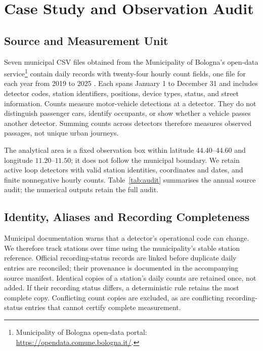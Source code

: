 \documentclass[]{interact}
\begin{document}
\section{Case Study and Observation Audit}
\subsection{Source and Measurement Unit}
Seven municipal CSV files obtained from the Municipality of Bologna's open-data service\footnote{Municipality of Bologna open-data portal: \url{https://opendata.comune.bologna.it/}.} contain daily records with twenty-four hourly count fields, one file for each year from 2019 to 2025 \cite{counts}. Each spans January 1 to December 31 and includes detector codes, station identifiers, positions, device types, status, and street information. Counts measure motor-vehicle detections at a detector. They do not distinguish passenger cars, identify occupants, or show whether a vehicle passes another detector. Summing counts across detectors therefore measures observed passages, not unique urban journeys.

The analytical area is a fixed observation box within latitude $44.40$--$44.60$ and longitude $11.20$--$11.50$; it does not follow the municipal boundary. We retain active loop detectors with valid station identities, coordinates and dates, and finite nonnegative hourly counts. Table~\ref{tab:audit} summarises the annual source audit; the numerical outputs retain the full audit.

\begin{table}[t]
\caption{Source audit before cross-year stability checks and panel selection. Complete detector-days require all 24 hourly recording flags to equal 100\%. Zero-total days are retained, not treated as missing.}
\label{tab:audit}\centering\scriptsize

\end{table}

\subsection{Identity, Aliases and Recording Completeness}
Municipal documentation warns that a detector's operational code can change. We therefore track stations over time using the municipality's stable station reference. Official recording-status records are linked before duplicate daily entries are reconciled; their provenance is documented in the accompanying source manifest. Identical copies of a station's daily counts are retained once, not added. If their recording status differs, a deterministic rule retains the most complete copy. Conflicting count copies are excluded, as are conflicting recording-status entries that cannot certify complete measurement.
\end{document}
